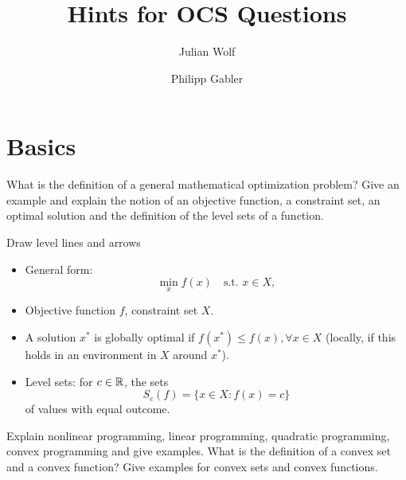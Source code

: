 \documentclass{article}
\title{Hints for OCS Questions}
\author{Julian Wolf \and Philipp Gabler}
\begin{document}
\maketitle

\section{Basics}

\begin{question}
  What is the definition of a general mathematical optimization problem?  Give an example and
  explain the notion of an objective function, a constraint set, an optimal solution and the
  definition of the level sets of a function.
\end{question}
Draw level lines and arrows
\begin{itemize}
\item General form:
  \begin{equation*}
    \min_{x} f(x) \quad \text{s.t. } x \in X,
  \end{equation*}
\item Objective function \(f\), constraint set \(X\).
\item A solution \(x^*\) is globally optimal if \(f(x^*) \leq f(x), \forall x \in X\) (locally, if
  this holds in an environment in \(X\) around \(x^*\)).
\item Level sets: for \(c \in \mathbb{R}\), the sets
  \begin{equation*}
    S_c(f) = \{x \in X: f(x) = c\}
  \end{equation*}
  of values with equal outcome.
\end{itemize}

\begin{question}
  Explain nonlinear programming, linear programming, quadratic programming, convex programming and
  give examples. What is the definition of a convex set and a convex function? Give examples for
  convex sets and convex functions.
\end{question}
\end{document}
